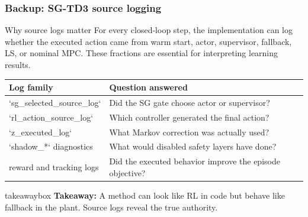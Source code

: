 \documentclass[aspectratio=169]{beamer}
\newcommand{\takeawaybox}[1]{%
\vspace{0.02cm}
\begin{center}
\begin{beamercolorbox}[wd=0.94\textwidth,sep=3pt,center,rounded=true,shadow=false]{takeawaybox}
\scriptsize
\textbf{\textcolor{maroon1}{Takeaway:}} #1
\end{beamercolorbox}
\end{center}
}
\begin{document}
\begin{frame}
\frametitle{\large \textbf{Backup: SG-TD3 source logging}}
\scriptsize

\begin{block}{Why source logs matter}
For every closed-loop step, the implementation can log whether the executed action came from warm start, actor, supervisor, fallback, LS, or nominal MPC. These fractions are essential for interpreting learning results.
\end{block}

\begin{center}
\renewcommand{\arraystretch}{1.2}
\begin{tabular}{p{}p{}}
\toprule
\textbf{Log family} & \textbf{Question answered}\\
\midrule
`sg\_selected\_source\_log` & Did the SG gate choose actor or supervisor?\\
`rl\_action\_source\_log` & Which controller generated the final action?\\
`z\_executed\_log` & What Markov correction was actually used?\\
`shadow\_*` diagnostics & What would disabled safety layers have done?\\
reward and tracking logs & Did the executed behavior improve the episode objective?\\
\bottomrule
\end{tabular}
\end{center}

\takeawaybox{A method can look like RL in code but behave like fallback in the plant. Source logs reveal the true authority.}
\end{frame}
\end{document}
